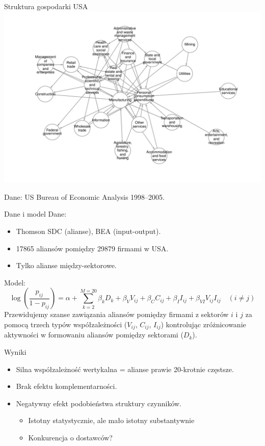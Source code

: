 \documentclass{beamer}
\begin{document}
\begin{frame}{Struktura gospodarki USA}
	\centering\includegraphics[width=\textwidth]{ioflowtop}

	Dane: US Bureau of Economic Analysis 1998--2005.
\end{frame}




\begin{frame}{Dane i model}
	Dane:
	\begin{itemize}
		\item Thomson SDC (alianse), BEA (input-output).
		\item 17865 aliansów pomiędzy 29879 firmami w USA.
		\item Tylko alianse między-sektorowe.
	\end{itemize}

	Model:
	\begin{equation*}
		\log \left( \frac{p_{ij}}{1-p_{ij}} \right) =
		\alpha + \sum_{k=2}^{M=20} \beta_k D_k +
		\beta_V V_{ij} + \beta_C C_{ij} + \beta_I I_{ij} +
		\beta_{VI} V_{ij} I_{ij}
		\quad (i \neq j)
	\end{equation*}
	Przewidujemy szanse zawiązania aliansów pomiędzy firmami z sektorów $i$ i $j$
	za pomocą trzech typów współzależności ($V_{ij}$, $C_{ij}$, $I_{ij}$) kontrolując
	zróżnicowanie aktywności w formowaniu aliansów pomiędzy sektorami ($D_k$).
\end{frame}


\begin{frame}{Wyniki}
	\begin{itemize}
		\item Silna współzależność wertykalna = alianse prawie 20-krotnie częstsze.
		\item Brak efektu komplementarności.
		\item Negatywny efekt podobieństwa struktury czynników.
			\begin{footnotesize}
				\begin{itemize}
					\item Istotny statystycznie, ale mało istotny substantywnie
					\item Konkurencja o dostawców?
				\end{itemize}
			\end{footnotesize}
	\end{itemize}
\end{frame}
\end{document}
